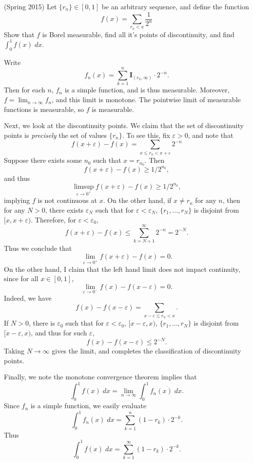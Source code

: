 \documentclass[answers]{exam}
\theoremstyle{problemstyle}
\newcommand{\1}[1]{\textbf{1}_{\left[#1\right]}} %
\begin{document}
\begin{questions}
\question (Spring 2015)
    Let $\{ r_n \} \in [0,1]$ be an arbitrary sequence, and define the function
    \[ f(x) = \sum_{r_n < x} \frac{1}{2^n} \]
    Show that $f$ is Borel measurable, find all it's points of discontinuity, and find $\int_0^1 f(x)\; dx$.
\begin{solution}
    Write
    \[ f_n(x) = \sum_{k = 1}^n \mathbf{I}_{(r_n, \infty)} \cdot 2^{-n}. \]
    Then for each $n$, $f_n$ is a simple function, and is thus measurable. Moreover, $f = \lim_{n \to \infty} f_n$, and this limit is monotone. The pointwise limit of measurable functions is measurable, so $f$ is measurable.
    
    Next, we look at the discontinuity points. We claim that the set of discontinuity points is \emph{precisely} the set of values $\{ r_n \}$. To see this, fix $\varepsilon > 0$, and note that
    \[ f(x + \varepsilon) - f(x) = \sum_{x \leq r_n < x + \varepsilon} 2^{-n} \]
    Suppose there exists some $n_0$ such that $x = r_{n_0}$. Then
    \[ f(x + \varepsilon) - f(x) \geq 1/2^{n_0}, \]
    and thus
    \[ \limsup_{\varepsilon \to 0^+} f(x + \varepsilon) - f(x) \geq 1/2^{n_0}, \]
    implying $f$ is not continuous at $x$. On the other hand, if $x \neq r_n$ for any $n$, then for any $N > 0$, there exists $\varepsilon_N$ such that for $\varepsilon < \varepsilon_N$, $\{ r_1, \dots, r_N \}$ is disjoint from $[x,x+\varepsilon)$. Therefore, for $\varepsilon < \varepsilon_0$,
    \[ f(x + \varepsilon) - f(x) \leq \sum_{k = N+1}^\infty 2^{-n} = 2^{-N}. \]
    Thus we conclude that
    \[ \lim_{\varepsilon \to 0^+} f(x + \varepsilon) - f(x) = 0. \]
    On the other hand, I claim that the left hand limit does not impact continuity, since for all $x \in [0,1]$,
    \[ \lim_{\varepsilon \to 0^-} f(x) - f(x-\varepsilon) = 0. \]
    Indeed, we have
    \[ f(x) - f(x-\varepsilon) = \sum_{x - \varepsilon \leq r_n < x}. \]
    If $N > 0$, there is $\varepsilon_0$ such that for $\varepsilon < \varepsilon_0$, $[x-\varepsilon,x)$, $\{ r_1, \dots, r_N \}$ is disjoint from $[x-\varepsilon,x)$, and thus for such $\varepsilon$,
    \[ f(x) - f(x-\varepsilon) \leq 2^{-N}. \]
    Taking $N \to \infty$ gives the limit, and completes the classification of discontinuity points.
    
    Finally, we note the monotone convergence theorem implies that
    \[ \int_0^1 f(x)\; dx = \lim_{n \to \infty} \int_0^1 f_n(x)\; dx. \]
    Since $f_n$ is a simple function, we easily evaluate
    \[ \int_0^1 f_n(x)\; dx = \sum_{k = 1}^n (1 - r_k) \cdot 2^{-k}. \]
    Thus
    \[ \int_0^1 f(x)\; dx = \sum_{k = 1}^\infty (1 - r_k) \cdot 2^{-k}. \]
\end{solution}



\end{questions}
\end{document}
